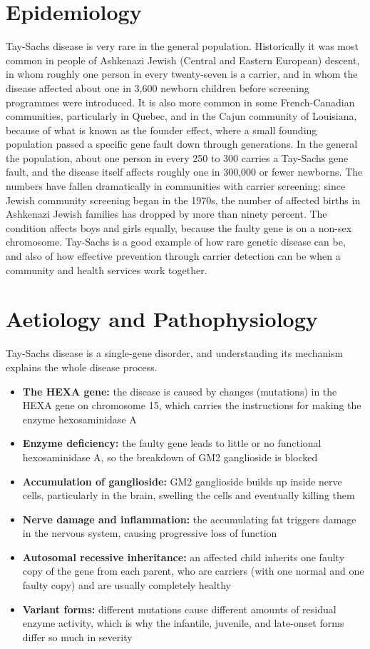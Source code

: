 \section*{Epidemiology}
Tay-Sachs disease is very rare in the general population. Historically it was most common in people of Ashkenazi Jewish (Central and Eastern European) descent, in whom roughly one person in every twenty-seven is a carrier, and in whom the disease affected about one in 3,600 newborn children before screening programmes were introduced. It is also more common in some French-Canadian communities, particularly in Quebec, and in the Cajun community of Louisiana, because of what is known as the founder effect, where a small founding population passed a specific gene fault down through generations. In the general the population, about one person in every 250 to 300 carries a Tay-Sachs gene fault, and the disease itself affects roughly one in 300,000 or fewer newborns. The numbers have fallen dramatically in communities with carrier screening: since Jewish community screening began in the 1970s, the number of affected births in Ashkenazi Jewish families has dropped by more than ninety percent. The condition affects boys and girls equally, because the faulty gene is on a non-sex chromosome. Tay-Sachs is a good example of how rare genetic disease can be, and also of how effective prevention through carrier detection can be when a community and health services work together.

\section*{Aetiology and Pathophysiology}
Tay-Sachs disease is a single-gene disorder, and understanding its mechanism explains the whole disease process.

\begin{itemize}
    \item \textbf{The HEXA gene:} the disease is caused by changes (mutations) in the HEXA gene on chromosome 15, which carries the instructions for making the enzyme hexosaminidase A
    \item \textbf{Enzyme deficiency:} the faulty gene leads to little or no functional hexosaminidase A, so the breakdown of GM2 ganglioside is blocked
    \item \textbf{Accumulation of ganglioside:} GM2 ganglioside builds up inside nerve cells, particularly in the brain, swelling the cells and eventually killing them
    \item \textbf{Nerve damage and inflammation:} the accumulating fat triggers damage in the nervous system, causing progressive loss of function
    \item \textbf{Autosomal recessive inheritance:} an affected child inherits one faulty copy of the gene from each parent, who are carriers (with one normal and one faulty copy) and are usually completely healthy
    \item \textbf{Variant forms:} different mutations cause different amounts of residual enzyme activity, which is why the infantile, juvenile, and late-onset forms differ so much in severity
\end{itemize}

